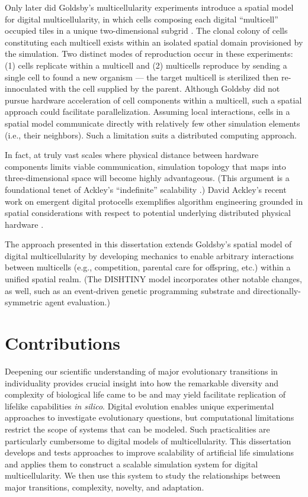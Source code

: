 Only later did Goldsby's multicellularity experiments introduce a spatial model for digital multicellularity, in which cells composing each digital ``multicell'' occupied tiles in a unique two-dimensional subgrid \citep{goldsby2014evolutionary}.
The clonal colony of cells constituting each multicell exists within an isolated spatial domain provisioned by the simulation.
Two distinct modes of reproduction occur in these experiments:
(1) cells replicate within a multicell and
(2) multicells reproduce by sending a single cell to found a new organism --- the target multicell is sterilized then re-innoculated with the cell supplied by the parent.
Although Goldsby did not pursue hardware acceleration of cell components within a multicell, such a spatial approach could facilitate parallelization.
Assuming local interactions, cells in a spatial model communicate directly with relatively few other simulation elements (i.e., their neighbors).
Such a limitation suits a distributed computing approach.

In fact, at truly vast scales where physical distance between hardware components limits viable communication, simulation topology that maps into three-dimensional space will become highly advantageous.
(This argument is a foundational tenet of Ackley's ``indefinite'' scalability \citep{ackley2011pursue}.)
David Ackley's recent work on emergent digital protocells exemplifies algorithm engineering grounded in spatial considerations with respect to potential underlying distributed physical hardware \citep{ackley2018digital,ackley2019building}.

The approach presented in this dissertation extends Goldsby's spatial model of digital multicellularity by developing mechanics to enable arbitrary interactions between multicells (e.g., competition, parental care for offspring, etc.) within a unified spatial realm.
(The DISHTINY model incorporates other notable changes, as well, such as an event-driven genetic programming substrate and directionally-symmetric agent evaluation.)

\section{Contributions}

Deepening our scientific understanding of major evolutionary transitions in individuality provides crucial insight into how the remarkable diversity and complexity of biological life came to be and may yield facilitate replication of lifelike capabilities \textit{in silico}.
Digital evolution enables unique experimental approaches to investigate evolutionary questions, but computational limitations restrict the scope of systems that can be modeled.
Such practicalities are particularly cumbersome to digital models of multicellularity.
This dissertation develops and tests approaches to improve scalability of artificial life simulations and applies them to construct a scalable simulation system for digital multicellularity.
We then use this system to study the relationships between major transitions, complexity, novelty, and adaptation.

